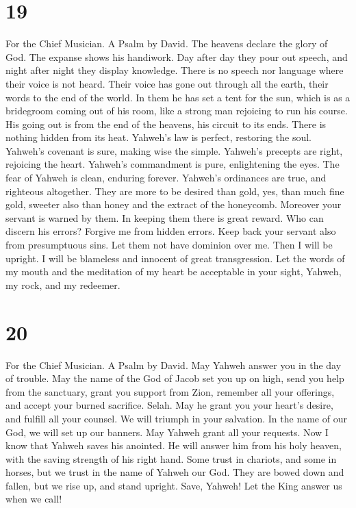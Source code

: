 \hypertarget{section-18}{%
\section{19}\label{section-18}}

For the Chief Musician. A Psalm by David.  The heavens
declare the glory of God. The expanse shows his handiwork.
 Day after day they pour out speech, and night after night
they display knowledge.  There is no speech nor language
where their voice is not heard.  Their voice has gone out
through all the earth, their words to the end of the world. In them he
has set a tent for the sun,  which is as a bridegroom
coming out of his room, like a strong man rejoicing to run his course.
 His going out is from the end of the heavens, his circuit
to its ends. There is nothing hidden from its heat. 
Yahweh's law is perfect, restoring the soul. Yahweh's covenant is sure,
making wise the simple.  Yahweh's precepts are right,
rejoicing the heart. Yahweh's commandment is pure, enlightening the
eyes.  The fear of Yahweh is clean, enduring forever.
Yahweh's ordinances are true, and righteous altogether. 
They are more to be desired than gold, yes, than much fine gold, sweeter
also than honey and the extract of the honeycomb. 
Moreover your servant is warned by them. In keeping them there is great
reward.  Who can discern his errors? Forgive me from
hidden errors.  Keep back your servant also from
presumptuous sins. Let them not have dominion over me. Then I will be
upright. I will be blameless and innocent of great transgression.
 Let the words of my mouth and the meditation of my heart
be acceptable in your sight, Yahweh, my rock, and my redeemer.

\hypertarget{section-19}{%
\section{20}\label{section-19}}

For the Chief Musician. A Psalm by David.  May Yahweh
answer you in the day of trouble. May the name of the God of Jacob set
you up on high,  send you help from the sanctuary, grant
you support from Zion,  remember all your offerings, and
accept your burned sacrifice. Selah.  May he grant you
your heart's desire, and fulfill all your counsel.  We
will triumph in your salvation. In the name of our God, we will set up
our banners. May Yahweh grant all your requests.  Now I
know that Yahweh saves his anointed. He will answer him from his holy
heaven, with the saving strength of his right hand.  Some
trust in chariots, and some in horses, but we trust in the name of
Yahweh our God.  They are bowed down and fallen, but we
rise up, and stand upright.  Save, Yahweh! Let the King
answer us when we call!

